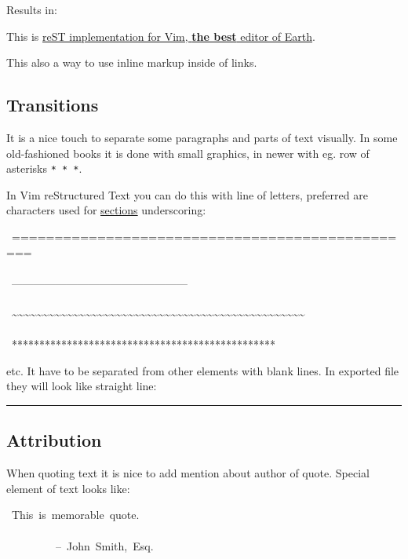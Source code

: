 \documentclass[12pt]{article}
\newcommand{\transition}{\begin{center}\rule{.8\textwidth}{0.2pt}\end{center}}
\begin{document}
Results in:

This is \href{http://skawina.eu.org/mikolaj/vst.html}{reST implementation for Vim, \textbf{the best} editor of Earth}.

This also a way to use inline markup inside of links.

\hypertarget{ltransitions}{}
\subsection{Transitions}

It is a nice touch to separate some paragraphs and parts of text
visually. In some old-fashioned books it is done with small graphics, in
newer with eg. row of asterisks \texttt{* * *}.

In Vim reStructured Text you can do this with line of letters, preferred are characters
used for \href{\#lsections}{sections} underscoring:

\begin{ttfamily}\begin{flushleft}
\mbox{~================================================}\\
\mbox{}\\
\mbox{~------------------------------------------------}\\
\mbox{}\\
\mbox{~\~{}\~{}\~{}\~{}\~{}\~{}\~{}\~{}\~{}\~{}\~{}\~{}\~{}\~{}\~{}\~{}\~{}\~{}\~{}\~{}\~{}\~{}\~{}\~{}\~{}\~{}\~{}\~{}\~{}\~{}\~{}\~{}\~{}\~{}\~{}\~{}\~{}\~{}\~{}\~{}\~{}\~{}\~{}\~{}\~{}\~{}\~{}\~{}}\\
\mbox{}\\
\mbox{~************************************************}\\
\end{flushleft}\end{ttfamily}

etc. It have to be separated from other elements with blank lines. In
exported file they will look like straight line:

\transition

\hypertarget{lattribution}{}
\subsection{Attribution}

When quoting text it is nice to add mention about author of quote. Special
element of text looks like:

\begin{ttfamily}\begin{flushleft}
\mbox{~This~is~memorable~quote.}\\
\mbox{}\\
\mbox{~~~~~~~~~--~John~Smith,~Esq.}\\
\end{flushleft}\end{ttfamily}
\end{document}
